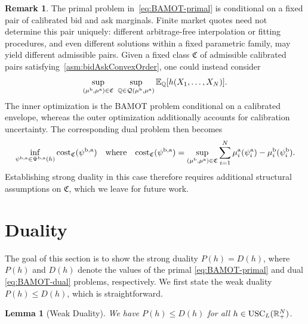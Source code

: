 \documentclass[11pt]{article}
\newcommand{\cQ}{\mathcal{Q}}
\newcommand{\R}{\mathbb{R}} %
\newcommand{\Q}{\mathbb{Q}} %
\theoremstyle{plain}
\newtheorem{lemma}[theorem]{Lemma}
\theoremstyle{definition}
\newtheorem{remark}[theorem]{Remark}
\theoremstyle{remark}
\newcommand{\E}{\mathbb{E}}
\theoremstyle{plain}
\begin{document}
\begin{remark}\label{rem:calibration-uncertainty}
The primal problem in~\eqref{eq:BAMOT-primal} is conditional on a fixed
pair of calibrated bid and ask marginals. Finite market quotes need not determine this pair uniquely: different
arbitrage-free interpolation or fitting procedures, and even different
solutions within a fixed parametric family, may yield different
admissible pairs. Given a
fixed class $\mathfrak C$ of admissible calibrated pairs satisfying~\cref{asm:bidAskConvexOrder}, one could instead consider
\[
\sup_{(\mu^{\rm b},\mu^{\rm a})\in\mathfrak C}
\ \sup_{\Q\in\cQ(\mu^{\rm b},\mu^{\rm a})}
\E_\Q[h(X_1,\ldots,X_N)].
\]
The inner optimization is the BAMOT problem conditional on a calibrated
envelope, whereas the outer optimization additionally accounts for
calibration uncertainty. The corresponding dual problem then becomes 
\[
\inf_{\psi^{\rm b,a} \in \Psi^{\rm b,a}(h)} \text{cost}_{\mathfrak C}(\psi^{\rm b,a})\quad{\rm where}\quad \text{cost}_{\mathfrak C}(\psi^{\rm b,a}) = \sup_{(\mu^{\rm b},\mu^{\rm a})\in\mathfrak C} \sum_{i=1}^N  \mu^{\rm a}_i(\psi^{\rm a}_i) - \mu^{\rm{b}}_i(\psi^{\rm b}_i).
\]
Establishing strong duality in this case therefore requires additional structural
assumptions on $\mathfrak C$, which we leave for future work.
\end{remark}


%
%
%
%

\section{Duality}\label{sec:duality}

The goal of this section is to show the strong duality $P(h)=D(h)$, where $P(h)$ and $D(h)$ denote the values of the primal \eqref{eq:BAMOT-primal} and dual \eqref{eq:BAMOT-dual} problems, respectively. We first state the weak duality $P(h)\le D(h)$, which is straightforward. 

\begin{lemma}[Weak Duality]\label{lemma:weak-duality}
We have $P(h)\le D(h)$ for all $h\in \textnormal{USC}_L(\R^N_+)$.
\end{lemma}
\end{document}
